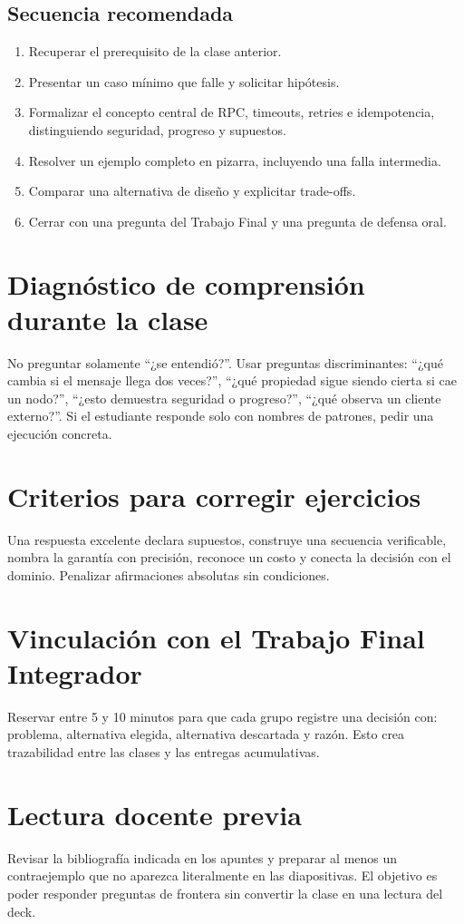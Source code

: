 \documentclass[variant=docente,cover=institutional,mode=screen]{ua-engineering-v6-article}
\begin{document}
\subsection*{Secuencia recomendada}
\begin{enumerate}
\item Recuperar el prerequisito de la clase anterior.
\item Presentar un caso mínimo que falle y solicitar hipótesis.
\item Formalizar el concepto central de RPC, timeouts, retries e idempotencia, distinguiendo seguridad, progreso y supuestos.
\item Resolver un ejemplo completo en pizarra, incluyendo una falla intermedia.
\item Comparar una alternativa de diseño y explicitar trade-offs.
\item Cerrar con una pregunta del Trabajo Final y una pregunta de defensa oral.
\end{enumerate}
\section{Diagnóstico de comprensión durante la clase}
No preguntar solamente ``¿se entendió?''. Usar preguntas discriminantes: ``¿qué cambia si el mensaje llega dos veces?'', ``¿qué propiedad sigue siendo cierta si cae un nodo?'', ``¿esto demuestra seguridad o progreso?'', ``¿qué observa un cliente externo?''. Si el estudiante responde solo con nombres de patrones, pedir una ejecución concreta.
\section{Criterios para corregir ejercicios}
Una respuesta excelente declara supuestos, construye una secuencia verificable, nombra la garantía con precisión, reconoce un costo y conecta la decisión con el dominio. Penalizar afirmaciones absolutas sin condiciones.
\section{Vinculación con el Trabajo Final Integrador}
Reservar entre 5 y 10 minutos para que cada grupo registre una decisión con: problema, alternativa elegida, alternativa descartada y razón. Esto crea trazabilidad entre las clases y las entregas acumulativas.
\section{Lectura docente previa}
Revisar la bibliografía indicada en los apuntes y preparar al menos un contraejemplo que no aparezca literalmente en las diapositivas. El objetivo es poder responder preguntas de frontera sin convertir la clase en una lectura del deck.
\end{document}
